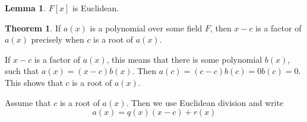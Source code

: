 \documentclass{article}
\theoremstyle{definition}
\newtheorem{theorem}{Theorem}
\theoremstyle{definition}
\newtheorem{lemma}{Lemma}
\begin{document}
\begin{lemma} 
  $F[x]$ is Euclidean.
\end{lemma} 

\begin{theorem} 
  If $a(x)$ is a polynomial over some field $F$, then $x - c$ is a factor of $a(x)$ precisely when $c$ is a root of $a(x)$.
\end{theorem}
If $x - c$ is a factor of $a(x)$, this means that there is some polynomial $b(x)$, such that $a(x) = (x - c)b(x)$. Then $a(c) = (c - c)b(c) = 0 b(c) = 0$. This shows that $c$ is a root of $a(x)$.

Assume that $c$ is a root of $a(x)$. Then we use Euclidean division and write 
$$ a(x) = q(x)(x - c) + r(x) $$


% 
% 
% 
% 
% 
\end{document}

